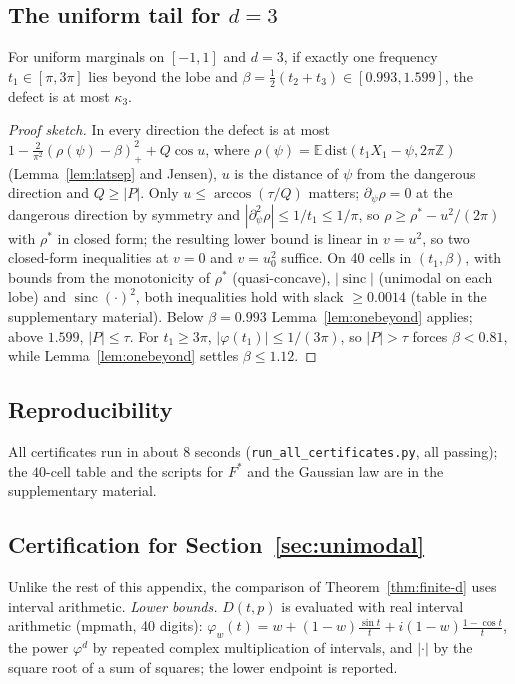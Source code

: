 \documentclass[11pt]{amsart}
\theoremstyle{definition}\newtheorem{definition}[theorem]{Definition}\theoremstyle{remark}\newtheorem{remark}[theorem]{Remark}
\newcommand{\sinc}{\operatorname{sinc}}\newcommand{\E}{\mathbb E}\newcommand{\cx}{\le_{\mathrm{cx}}}
\begin{document}
\subsection{The uniform tail for $d=3$}
\begin{lemma}\label{lem:c3}
For uniform marginals on $[-1,1]$ and $d=3$, if exactly one frequency $t_1\in[\pi,3\pi]$ lies beyond the lobe and $\beta=\frac12(t_2+t_3)\in[0.993,1.599]$, the defect is at most $\kappa_3$.
\end{lemma}
\begin{proof}[Proof sketch]In every direction the defect is at most $1-\frac2{\pi^2}(\rho(\psi)-\beta)_+^2+Q\cos u$, where $\rho(\psi)=\E\,\mathrm{dist}(t_1X_1-\psi,2\pi\mathbb Z)$ (Lemma~\ref{lem:latsep} and
Jensen), $u$ is the distance of $\psi$ from the dangerous direction and $Q\ge|P|$. Only $u\le\arccos(\tau/Q)$ matters; $\partial_\psi\rho=0$ at the dangerous direction by symmetry and
$|\partial_\psi^2\rho|\le1/t_1\le1/\pi$, so $\rho\ge\rho^*-u^2/(2\pi)$ with $\rho^*$ in closed form; the resulting lower bound is linear in $v=u^2$, so two closed-form inequalities at
$v=0$ and $v=u_0^2$ suffice. On 40 cells in $(t_1,\beta)$, with bounds from the monotonicity of $\rho^*$ (quasi-concave), $|\sinc|$ (unimodal on each lobe) and $\sinc(\cdot)^2$,
both inequalities hold with slack $\ge0.0014$ (table in the supplementary material). Below $\beta=0.993$ Lemma~\ref{lem:onebeyond} applies; above $1.599$, $|P|\le\tau$. For $t_1\ge3\pi$, $|\varphi(t_1)|\le1/(3\pi)$, so $|P|>\tau$ forces $\beta<0.81$, while
Lemma~\ref{lem:onebeyond} settles $\beta\le1.12$.\end{proof}

\subsection{Reproducibility}
All certificates run in about $8$ seconds (\texttt{run\_all\_certificates.py}, all passing); the $40$-cell table and the scripts for $F^*$ and the Gaussian law are in the supplementary material.

\subsection{Certification for Section~\ref{sec:unimodal}}\label{app:unimodal}
Unlike the rest of this appendix, the comparison of Theorem~\ref{thm:finite-d} uses interval arithmetic. \emph{Lower bounds.} $D(t,p)$ is evaluated with real interval arithmetic (mpmath, 40 digits): $\varphi_w(t)=w+(1-w)\frac{\sin t}t+i(1-w)\frac{1-\cos t}t$, the power $\varphi^d$ by repeated
complex multiplication of intervals, and $|\cdot|$ by the square root of a sum of squares; the lower endpoint is reported.
\end{document}
